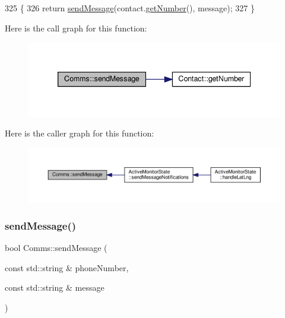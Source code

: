 \begin{DoxyCode}
325 \{
326    \textcolor{keywordflow}{return} \hyperlink{class_comms_a30ab10ea604ab2b169ca66f3f1071c0e}{sendMessage}(contact.\hyperlink{class_contact_a612095b153e05538c32400c4c44cb1aa}{getNumber}(), message);
327 \}
\end{DoxyCode}
Here is the call graph for this function\+:\nopagebreak
\begin{figure}[H]
\begin{center}
\leavevmode
\includegraphics[width=339pt]{d8/dcc/class_comms_a30ab10ea604ab2b169ca66f3f1071c0e_cgraph}
\end{center}
\end{figure}
Here is the caller graph for this function\+:\nopagebreak
\begin{figure}[H]
\begin{center}
\leavevmode
\includegraphics[width=350pt]{d8/dcc/class_comms_a30ab10ea604ab2b169ca66f3f1071c0e_icgraph}
\end{center}
\end{figure}
\mbox{\label{class_comms_ad28b072a0852ac95aa2475324cbfae60}} 
\subsubsection{\texorpdfstring{send\+Message()}{sendMessage()}\hspace{0.1cm}{\footnotesize\ttfamily [2/2]}}
{\footnotesize\ttfamily bool Comms\+::send\+Message (\begin{DoxyParamCaption}\item[{const std\+::string \&}]{phone\+Number,  }\item[{const std\+::string \&}]{message }\end{DoxyParamCaption})}

